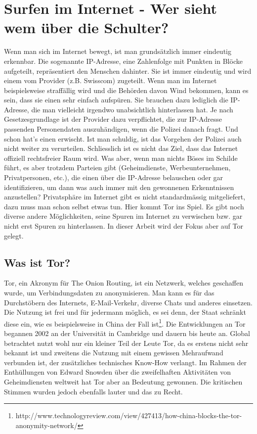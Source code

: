 \newpage
\section{Surfen im Internet - Wer sieht wem über die Schulter?}
Wenn man sich im Internet bewegt, ist man grundsätzlich immer eindeutig erkennbar. Die sogenannte IP-Adresse, eine Zahlenfolge mit Punkten in Blöcke aufgeteilt, repräsentiert den Menschen dahinter. Sie ist immer eindeutig und wird einem vom Provider (z.B. Swisscom) zugeteilt. Wenn man im Internet beispielsweise straffällig wird und die Behörden davon Wind bekommen, kann es sein, dass sie einen sehr einfach aufspüren. Sie brauchen dazu lediglich die IP-Adresse, die man vielleicht irgendwo unabsichtlich hinterlassen hat. Je nach Gesetzesgrundlage ist der Provider dazu verpflichtet, die zur IP-Adresse passenden Personendaten auszuhändigen, wenn die Polizei danach fragt. Und schon hat's einen erwischt. Ist man schuldig, ist das Vorgehen der Polizei auch nicht weiter zu verurteilen. Schliesslich ist es nicht das Ziel, dass das Internet offiziell rechtsfreier Raum wird. Was aber, wenn man nichts Böses im Schilde führt, es aber trotzdem Parteien gibt (Geheimdienste, Werbeunternehmen, Privatpersonen, etc.), die einen über die IP-Adresse belauschen oder gar identifizieren, um dann was auch immer mit den gewonnenen Erkenntnissen anzustellen? Privatsphäre im Internet gibt es nicht standardmässig mitgeliefert, dazu muss man schon selbst etwas tun. Hier kommt Tor ins Spiel. Es gibt noch diverse andere Möglichkeiten, seine Spuren im Internet zu verwischen bzw. gar nicht erst Spuren zu hinterlassen. In dieser Arbeit wird der Fokus aber auf Tor gelegt.

\subsection{Was ist Tor?}
Tor, ein Akronym für The Onion Routing, ist ein Netzwerk, welches geschaffen wurde, um Verbindungsdaten zu anonymisieren. Man kann es für das Durchstöbern des Internets, E-Mail-Verkehr, diverse Chats und anderes einsetzen. Die Nutzung ist frei und für jedermann möglich, es sei denn, der Staat schränkt diese ein, wie es beispielsweise in China der Fall ist\footnote{http://www.technologyreview.com/view/427413/how-china-blocks-the-tor-anonymity-network/}.
Die Entwicklungen an Tor begannen 2002 an der Universität in Cambridge und dauern bis heute an. Global betrachtet nutzt wohl nur ein kleiner Teil der Leute Tor, da es erstens nicht sehr bekannt ist und zweitens die Nutzung mit einem gewissen Mehraufwand verbunden ist, der zusätzliches technisches Know-How verlangt. Im Rahmen der Enthüllungen von Edward Snowden über die zweifelhaften Aktivitäten von Geheimdiensten weltweit hat Tor aber an Bedeutung gewonnen. Die kritischen Stimmen wurden jedoch ebenfalls lauter und das zu Recht.

